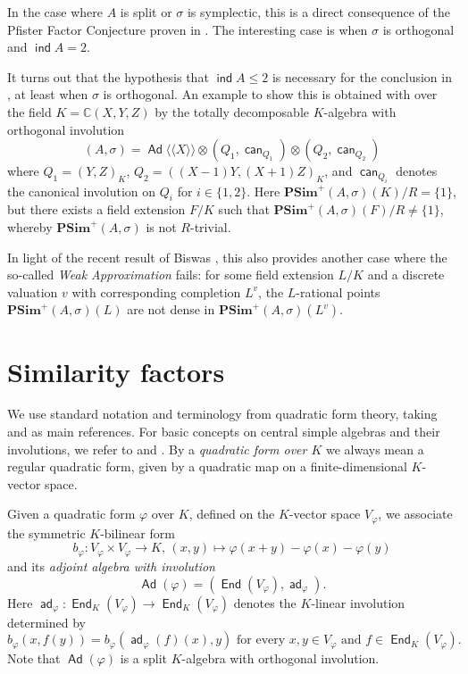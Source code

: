 \documentclass[twoside,11pt]{amsart}
\numberwithin{equation}{section}
\theoremstyle{definition}
\newcommand\ind{\operatorname{\mathsf{ind}}}
\newcommand\End{\operatorname{\mathsf{End}}}
\newcommand{\can}{\operatorname{\mathsf{can}}}
\newcommand{\vf}{\varphi}
\newcommand{\s}{\sigma}
\newcommand{\la}{\langle}
\newcommand{\ra}{\rangle}
\newcommand{\lla}{\la\!\la}
\newcommand{\rra}{\ra\!\ra}
\renewcommand{\leq}{\leqslant}
\newcommand\Ad{\operatorname{\mathsf{Ad}}}
\newcommand\ad{\operatorname{\mathsf{ad}}}
\newcommand{\cc}{\mathbb{C}}
\begin{document}
In the case where $A$ is split or $\s$ is symplectic, this is a direct consequence of the Pfister Factor Conjecture proven in \cite{Bec08}.
The interesting case is when $\s$ is orthogonal and $\ind A=2$.

It turns out that the hypothesis that $\ind A\leq 2$ is necessary for the conclusion in , at least when $\s$ is orthogonal.
An example to show this is obtained with  over the field $K=\cc(X,Y,Z)$ by the  totally decomposable  
$K$-algebra with orthogonal involution  $$(A,\s)=\Ad\lla X\rra\otimes(Q_1,\can_{Q_1})\otimes (Q_2,\can_{Q_2})$$
where $Q_1=(Y,Z)_K$, $Q_2=((X-1)Y,(X+1)Z)_K$,
and $\can_{Q_i}$ denotes the canonical involution on $Q_i$ for $i\in\{1,2\}$.
Here $\mathbf{PSim}^+(A,\s)(K)/R=\{1\}$, but there exists a field extension $F/K$ such that $\mathbf{PSim}^+(A,\s)(F)/R\neq \{1\}$, whereby $\mathbf{PSim}^+(A,\s)$ is not $R$-trivial.

In light of the recent result of Biswas \cite{Bis26}, this also provides another case where the so-called \emph{Weak Approximation} fails: for some field extension $L/K$ and a discrete valuation $v$ with corresponding completion $L^v$, the $L$-rational points $\mathbf{PSim}^+(A,\s)(L)$ are not dense in $\mathbf{PSim}^+(A,\s)(L^v)$.


\section{Similarity factors}
\label{S:simfact}

We use standard notation and terminology from quadratic form theory, taking \cite{EKM08} and \cite{Lam05} as main references.
For basic concepts on central simple algebras and their involutions, we refer to \cite[Chap.~8]{Scha85} and \cite{KMRT98}.
By a \emph{quadratic form over $K$} we always mean a regular quadratic form, given by a quadratic map  on a finite-dimensional $K$-vector space.

Given a quadratic form $\vf$ over $K$, defined on the $K$-vector space $V_\vf$,
we associate the symmetric 
$K$-bilinear form $$b_\vf:V_\vf\times V_\vf\to K,\,(x,y)\mapsto \vf(x+y)-\vf(x)-\vf(y)$$ and its 
\emph{adjoint algebra with involution} $$\Ad(\vf)=(\End(V_\vf),\ad_\vf).$$
Here $\ad_\vf:\End_K(V_\vf)\to\End_K(V_\vf)$ denotes the $K$-linear involution determined by
$$ b_\vf(x,f(y))=b_\vf(\ad_\vf(f)(x),y)\text{ for every } x,y\in V_\vf\text{ and } f\in\End_K(V_\vf).$$
Note that $\Ad(\vf)$ is a split $K$-algebra with orthogonal involution.
\end{document}
